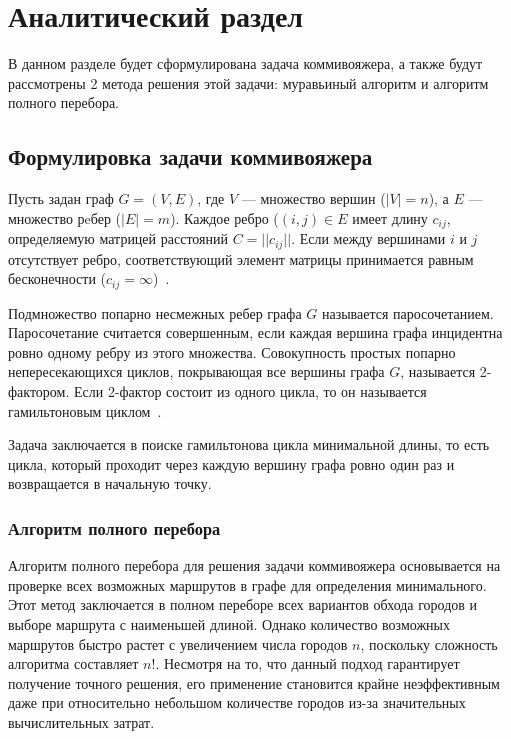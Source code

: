 \chapter{Аналитический раздел}

В данном разделе будет сформулирована задача коммивояжера, а также будут рассмотрены 2 метода решения этой задачи: муравьиный алгоритм и алгоритм
полного перебора.

\section{Формулировка задачи коммивояжера}

Пусть задан граф $G = (V, E)$, где $V$ --- множество вершин ($|V|=n$), а $E$ --- множество рeбер ($|E|=m$). Каждое ребро ($(i,j)\in E$ имеет длину $c_{ij}$, определяемую матрицей расстояний $C=||c_{ij}||$. Если между вершинами $i$ и $j$ отсутствует ребро, соответствующий элемент матрицы принимается равным бесконечности ($c_{ij} = \infty$)~\cite{com_info}.

Подмножество попарно несмежных ребер графа $G$ называется паросочетанием. Паросочетание считается совершенным, если каждая вершина графа инцидентна ровно одному ребру из этого множества. Совокупность простых попарно непересекающихся циклов, покрывающая все вершины графа $G$, называется 2-фактором. Если 2-фактор состоит из одного цикла, то он называется гамильтоновым циклом~\cite{gamelton}.

Задача заключается в поиске гамильтонова цикла минимальной длины, то есть цикла, который проходит через каждую вершину графа ровно один раз и возвращается в начальную точку.


\subsection{Алгоритм полного перебора}
Алгоритм полного перебора для решения задачи коммивояжера основывается на проверке всех возможных маршрутов в графе для определения минимального. Этот метод заключается в полном переборе всех вариантов обхода городов и выборе маршрута с наименьшей длиной. Однако количество возможных маршрутов быстро растет с увеличением числа городов $n$, поскольку сложность алгоритма составляет $n!$. Несмотря на то, что данный подход гарантирует получение точного решения, его применение становится крайне неэффективным даже при относительно небольшом количестве городов из-за значительных вычислительных затрат.

